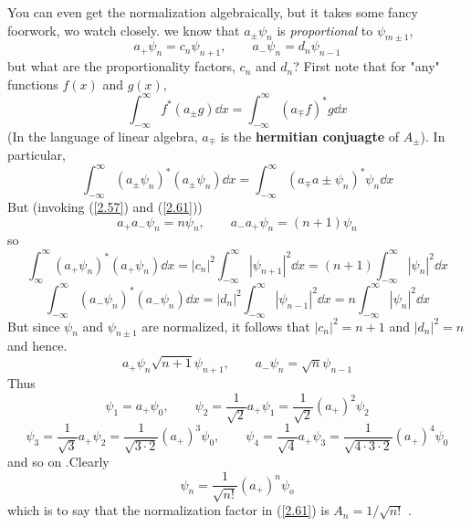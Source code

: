 You can even get the normalization algebraically, but it takes some fancy foorwork, wo watch closely. we know that $a_{\pm}\psi_n$ is \textit{proportional} to $\psi_{m\pm 1}$,
\begin{equation}\label{2.63}
	a_+\psi_n=c_n\psi_{n+1},\qquad a_-\psi_n=d_n\psi_{n-1}	
\end{equation}
but what are the proportionality factors, $c_n$ and $d_n$? First note that for "any" functions $f(x)$ and $g(x)$,
\begin{equation}\label{2.64}
	\int_{-\infty}^\infty f^*(a_{\pm}g)\dd x=\int_{-\infty}^\infty (a_{\mp}f)^*g\dd x
\end{equation}
(In the language of linear algebra, $a_{\mp}$ is the \textbf{hermitian conjuagte} of $A_{\pm}$).
In particular, $$\int_{-\infty}^\infty (a_{\pm}\psi_n)^*(a_{\pm}\psi_n)\dd x=\int_{-\infty}^\infty(a_{\mp}a{\pm}\psi_n)^*\psi_n\dd x $$ But (invoking (\ref{2.57}) and (\ref{2.61}))
\begin{equation}\label{2.65}
	a_+a_-\psi_n=n\psi_n,\qquad a_-a_+\psi_n=(n+1)\psi_n
\end{equation}
so
$$\int_{\infty}^\infty(a_+\psi_n)^*(a_+\psi_n)\dd x=|c_n|^2\int_{-\infty}^\infty |\psi_{n+1}|^2\dd x=(n+1)\int_{-\infty}^\infty |\psi_n|^2\dd x $$
$$\int_{-\infty}^\infty(a_-\psi_n)^*(a_-\psi_n)\dd x=|d_n|^2\int_{-\infty}^\infty |\psi_{n-1}|^2\dd x=n\int_{-\infty}^\infty |\psi_n|^2\dd x $$
But since $\psi_n$ and $\psi_{n\pm 1}$ are normalized, it follows that $|c_n|^2=n+1$ and $|d_n|^2=n$ and hence.
\begin{equation}\label{2.66}
	\boxed{a_+\psi_n\sqrt{n+1}\psi_{n+1},\qquad a_-\psi_n=\sqrt{n}\psi_{n-1}}
\end{equation}
Thus
$$\psi_1=a_+\psi_0,\qquad \psi_2=\frac{1}{\sqrt{2}}a_+\psi_1=\frac{1}{\sqrt{2}}(a_+)^2\psi_2$$
$$\psi_3=\frac{1}{\sqrt{3}}a_+\psi_2=\frac{1}{\sqrt{3\cdot 2}}(a_+)^3\psi_0,\qquad \psi_4=\frac{1}{\sqrt{4}}a_+\psi_3=\frac{1}{\sqrt{4\cdot 3\cdot 2}}(a_+)^4\psi_0$$
and so on .Clearly
\begin{equation}\label{2.67}
	\boxed{\psi_n=\frac{1}{\sqrt{n!}}(a_+)^n\psi_o}
\end{equation}
which is to say that the normalization factor in (\ref{2.61}) is $A_n=1/\sqrt{n!}$ .

